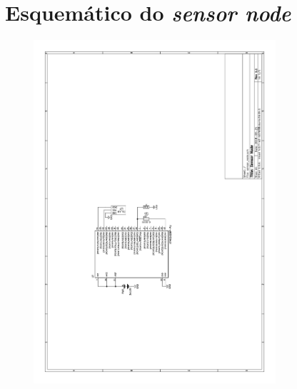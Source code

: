\documentclass[oneside,openright,12pt]{ufsm_2015} %
\begin{document}
\chapter{Esquemático do \textit{sensor node}}
\label{apendice:sensor-node-sch}
        \begin{figure}[H]
        \centering
        \includegraphics[width=0.8\textwidth]{figuras/sensor_node_sc.png}
        \vspace{\baselineskip} %
\end{figure}
\end{document}
